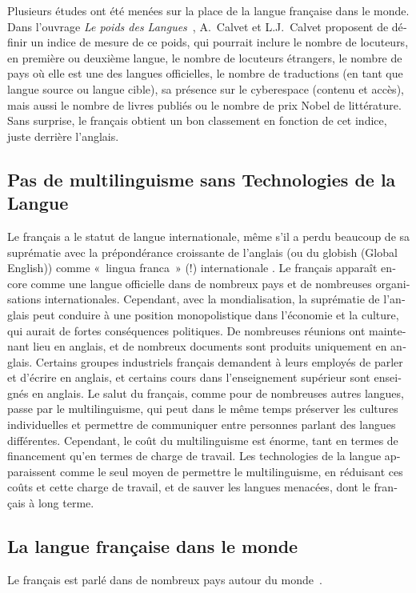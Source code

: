 \begin{french}
\begin{multicols}{2}
Plusieurs études ont été menées sur la place de la langue française
dans le monde. Dans l'ouvrage {\em Le poids des
  Langues}~\cite{calvet09}, A.~Calvet et L.J.~Calvet proposent de
définir un indice de mesure de ce poids, qui pourrait inclure le
nombre de locuteurs, en première ou deuxième langue, le nombre de
locuteurs étrangers, le nombre de pays où elle est une des langues
officielles, le nombre de traductions (en tant que langue source ou
langue cible), sa présence sur le cyberespace (contenu et accès), mais
aussi le nombre de livres publiés ou le nombre de prix Nobel de
littérature. Sans surprise, le français obtient un bon classement en
fonction de cet indice, juste derrière l'anglais.

\subsection{Pas de multilinguisme sans Technologies de la Langue}

Le français a le statut de langue internationale, même s'il a
perdu beaucoup de sa suprématie avec la prépondérance croissante de
l'anglais (ou du globish (Global English)) comme «~lingua franca~» (!)
internationale \cite{ostler2010}. Le français apparaît encore comme une langue
officielle dans de nombreux pays et de nombreuses organisations
internationales. Cependant, avec la mondialisation, la suprématie de
l'anglais peut conduire à une position monopolistique dans
l'économie et la culture, qui aurait de fortes conséquences
politiques. De nombreuses réunions ont maintenant lieu en anglais, et
de nombreux documents sont produits uniquement en anglais. Certains
groupes industriels français demandent à leurs employés de parler 
et d'écrire en anglais, et certains cours dans l'enseignement supérieur sont enseignés en anglais. Le salut du
français, comme pour de nombreuses autres langues, passe par le
multilinguisme, qui peut dans le même temps préserver les cultures
individuelles et permettre de communiquer entre personnes parlant
des langues différentes. Cependant, le coût du multilinguisme est
énorme, tant en termes de financement qu'en termes de charge
de travail. Les technologies de la langue apparaissent comme le seul
moyen de permettre le multilinguisme, en réduisant ces coûts et cette 
charge de travail, et de sauver les langues menacées, dont le français
à long terme.

\subsection{La langue française dans le monde}
\label{frenchInTheWorld}
Le français est parlé dans de nombreux pays autour du
monde~\cite{francais}.


\end{multicols}
\end{french}
